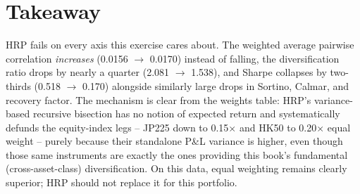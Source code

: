 \documentclass[11pt]{article}
\begin{document}
\section{Takeaway}

HRP fails on every axis this exercise cares about. The weighted average pairwise
correlation \emph{increases} (0.0156 $\to$ 0.0170) instead of falling, the
diversification ratio drops by nearly a quarter (2.081 $\to$ 1.538), and Sharpe
collapses by two-thirds (0.518 $\to$ 0.170) alongside similarly large drops in
Sortino, Calmar, and recovery factor. The mechanism is clear from the weights table:
HRP's variance-based recursive bisection has no notion of expected return and
systematically defunds the equity-index legs -- JP225 down to 0.15$\times$ and HK50 to
0.20$\times$ equal weight -- purely because their standalone P\&L variance is higher,
even though those same instruments are exactly the ones providing this book's
fundamental (cross-asset-class) diversification. On this data, equal weighting
remains clearly superior; HRP should not replace it for this portfolio.
\end{document}
